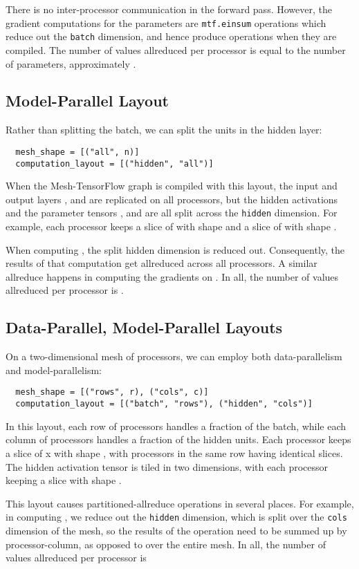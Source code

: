 \documentclass{article}
\begin{document}
There is no inter-processor communication in the forward pass. However, the gradient computations for the parameters are \texttt{mtf.einsum} operations which reduce out the \texttt{batch} dimension, and hence produce  operations when they are compiled.  The number of values allreduced per processor is equal to the number of parameters, approximately .

\subsection{Model-Parallel Layout} \label{exmp}
Rather than splitting the batch, we can split the units in the hidden layer:
\begin{verbatim}
  mesh_shape = [("all", n)]
  computation_layout = [("hidden", "all")]
\end{verbatim}
When the Mesh-TensorFlow graph is compiled with this layout, the input and output layers , and  are replicated on all processors, but the hidden activations  and the parameter tensors ,  and  are all split across the \texttt{hidden} dimension.   For example, each processor keeps a slice of  with shape  and a slice of  with shape .

When computing , the split hidden dimension is reduced out.  Consequently, the results of that computation get allreduced across all processors.  A similar allreduce happens in computing the gradients on .  In all, the number of values allreduced per processor is .


\subsection{Data-Parallel, Model-Parallel Layouts}
On a two-dimensional mesh of  processors, we can employ both data-parallelism and model-parallelism:
\begin{verbatim}
  mesh_shape = [("rows", r), ("cols", c)]
  computation_layout = [("batch", "rows"), ("hidden", "cols")]
\end{verbatim}

In this layout, each row of processors handles a fraction of the batch, while each column of processors handles a fraction of the hidden units.  Each processor keeps a slice of x with shape , with processors in the same row having identical slices.  The hidden activation tensor  is tiled in two dimensions, with each processor keeping a slice with shape .

This layout causes partitioned-allreduce operations in several places.  For example, in computing , we reduce out the \texttt{hidden} dimension, which is split over the \texttt{cols} dimension of the mesh, so the results of the operation need to be summed up by processor-column, as opposed to over the entire mesh.  In all, the number of values allreduced per processor is 
\end{document}
